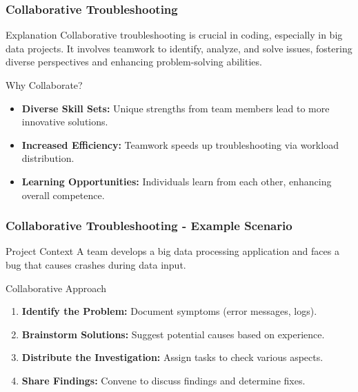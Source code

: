 \documentclass[aspectratio=169]{beamer}
\begin{document}
\begin{frame}
    \frametitle{Collaborative Troubleshooting}
    \begin{block}{Explanation}
        Collaborative troubleshooting is crucial in coding, especially in big data projects. It involves teamwork to identify, analyze, and solve issues, fostering diverse perspectives and enhancing problem-solving abilities.
    \end{block}
    
    \begin{block}{Why Collaborate?}
        \begin{itemize}
            \item \textbf{Diverse Skill Sets:} Unique strengths from team members lead to more innovative solutions.
            \item \textbf{Increased Efficiency:} Teamwork speeds up troubleshooting via workload distribution.
            \item \textbf{Learning Opportunities:} Individuals learn from each other, enhancing overall competence.
        \end{itemize}
    \end{block}
\end{frame}

\begin{frame}
    \frametitle{Collaborative Troubleshooting - Example Scenario}
    \begin{block}{Project Context}
        A team develops a big data processing application and faces a bug that causes crashes during data input.
    \end{block}
    
    \begin{block}{Collaborative Approach}
        \begin{enumerate}
            \item \textbf{Identify the Problem:} Document symptoms (error messages, logs).
            \item \textbf{Brainstorm Solutions:} Suggest potential causes based on experience.
            \item \textbf{Distribute the Investigation:} Assign tasks to check various aspects.
            \item \textbf{Share Findings:} Convene to discuss findings and determine fixes.
        \end{enumerate}
    \end{block}
\end{frame}
\end{document}

